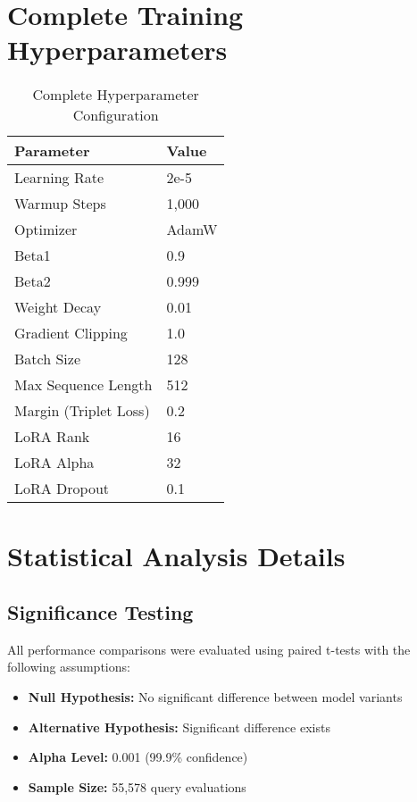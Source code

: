 \section{Complete Training Hyperparameters}

\begin{table}[h]
\centering
\caption{Complete Hyperparameter Configuration}
\begin{tabular}{ll}
\toprule
Parameter & Value \\
\midrule
Learning Rate & 2e-5 \\
Warmup Steps & 1,000 \\
Optimizer & AdamW \\
Beta1 & 0.9 \\
Beta2 & 0.999 \\
Weight Decay & 0.01 \\
Gradient Clipping & 1.0 \\
Batch Size & 128 \\
Max Sequence Length & 512 \\
Margin (Triplet Loss) & 0.2 \\
LoRA Rank & 16 \\
LoRA Alpha & 32 \\
LoRA Dropout & 0.1 \\
\bottomrule
\end{tabular}
\end{table}

\section{Statistical Analysis Details}

\subsection{Significance Testing}

All performance comparisons were evaluated using paired t-tests with the following assumptions:

\begin{itemize}
\item \textbf{Null Hypothesis:} No significant difference between model variants
\item \textbf{Alternative Hypothesis:} Significant difference exists
\item \textbf{Alpha Level:} 0.001 (99.9\% confidence)
\item \textbf{Sample Size:} 55,578 query evaluations
\end{itemize}

